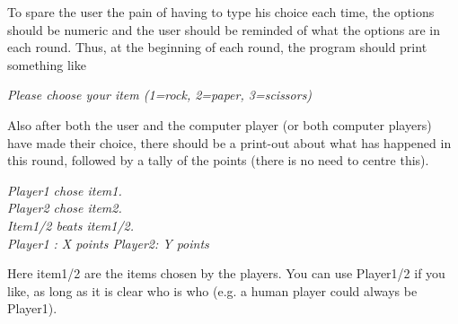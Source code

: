 \documentclass[11pt, leqno, a4paper]{article}
\begin{document}
To spare the user the pain of having to type his choice each time, the options should be numeric and the user should be reminded of what the options are in each
round. Thus, at the beginning of each round, the program should print something like
\begin{center}
\textit{Please choose your item (1=rock, 2=paper, 3=scissors)}
\end{center}
Also after both the user and the computer player (or both computer players) have made their choice, there should be a print-out about what has happened in this round,
followed by a tally of the points (there is no need to centre this). 
\begin{center}
\textit{Player1 chose item1.\\
Player2 chose item2.\\
Item1/2 beats item1/2.\\
Player1 : X points \hspace{0.5cm} Player2: Y points}
\end{center}

Here item1/2 are the items chosen by the players. You can use Player1/2 if you like, as long as it is clear who is who (e.g. a human player could always be Player1).
\end{document}
